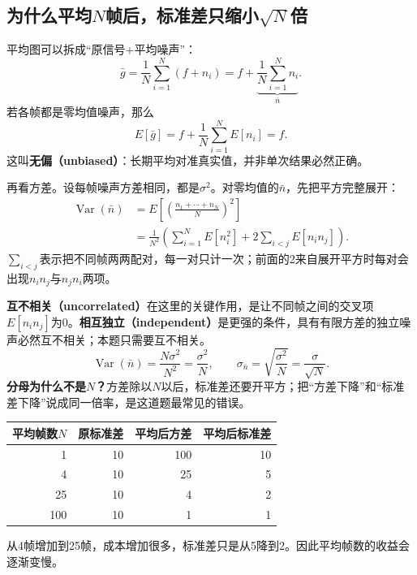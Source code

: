 \subsection{为什么平均$N$帧后，标准差只缩小$\sqrt N$倍}
平均图可以拆成“原信号+平均噪声”：
\[
  \bar g=\frac1N\sum_{i=1}^{N}(f+n_i)
        =f+\underbrace{\frac1N\sum_{i=1}^{N}n_i}_{\bar n}.
\]
若各帧都是零均值噪声，那么
\[
  E[\bar g]=f+\frac1N\sum_{i=1}^{N}E[n_i]=f.
\]
这叫\textbf{无偏（unbiased）}：长期平均对准真实值，并非单次结果必然正确。

再看方差。设每帧噪声方差相同，都是$\sigma^2$。对零均值的$\bar n$，先把平方完整展开：
\begin{align*}
 \operatorname{Var}(\bar n)
 &=E\left[\left(\frac{n_1+\cdots+n_N}{N}\right)^2\right]\\
 &=\frac1{N^2}\left(\sum_{i=1}^{N}E[n_i^2]
       +2\sum_{i<j}E[n_i n_j]\right).
\end{align*}
$\sum_{i<j}$表示把不同帧两两配对，每一对只计一次；前面的2来自展开平方时每对会出现$n_in_j$与$n_jn_i$两项。

\textbf{互不相关（uncorrelated）}在这里的关键作用，是让不同帧之间的交叉项$E[n_i n_j]$为0。\textbf{相互独立（independent）}是更强的条件，具有有限方差的独立噪声必然互不相关；本题只需要互不相关。
\[
  \operatorname{Var}(\bar n)
  =\frac{N\sigma^2}{N^2}=\frac{\sigma^2}{N},
  \qquad
  \sigma_{\bar n}=\sqrt{\frac{\sigma^2}{N}}=\frac{\sigma}{\sqrt N}.
\]
\textbf{分母为什么不是$N$？}方差除以$N$以后，标准差还要开平方；把“方差下降”和“标准差下降”说成同一倍率，是这道题最常见的错误。

\begin{center}
\begin{tabular}{rrrr}
\toprule
平均帧数$N$ & 原标准差 & 平均后方差 & 平均后标准差\\
\midrule
1  & 10 & 100 & 10\\
4  & 10 & 25 & 5\\
25 & 10 & 4 & 2\\
100 & 10 & 1 & 1\\
\bottomrule
\end{tabular}
\end{center}
从4帧增加到25帧，成本增加很多，标准差只是从5降到2。因此平均帧数的收益会逐渐变慢。


